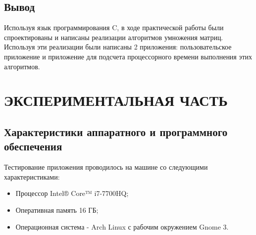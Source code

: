 \documentclass[a4paper,12pt]{article}
\begin{document}

\newpage


\newpage
\subsection{Вывод}
Используя язык программирования C, в ходе практической работы были спроектированы и написаны реализации алгоритмов умножения матриц. Используя эти реализации были написаны 2 приложения: пользовательское приложение и приложение для подсчета процессорного времени выполнения этих алгоритмов.

\newpage
\section{ЭКСПЕРИМЕНТАЛЬНАЯ ЧАСТЬ}
\subsection{Характеристики аппаратного и программного обеспечения}
Тестирование приложения проводилось на машине со следующими характеристиками:\\
\begin{itemize}
\item Процессор Intel® Core™ i7-7700HQ;
\item Оперативная память 16 ГБ;
\item Операционная система - Arch Linux с рабочим окружением Gnome 3.
\end{itemize}

\newpage
\end{document}
